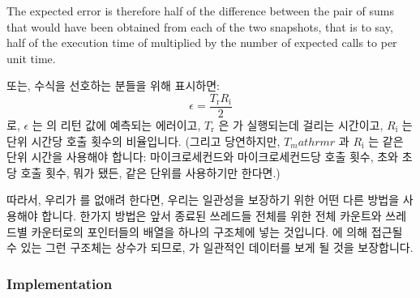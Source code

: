 {	The expected error is therefore half of the difference between
	the pair of sums that would have been obtained from each of the
	two snapshots, that is to say, half of the execution time of
	 multiplied by the number of expected calls to
	 per unit time.
	\fi

	또는, 수식을 선호하는 분들을 위해 표시하면:
	\begin{equation}
	\epsilon = \frac{T_\mathrm{r} R_\mathrm{i}}{2}
	\end{equation}
	로, $\epsilon$ 는  의 리턴 값에 예측되는 에러이고,
	$T_\mathrm{r}$ 은  가 실행되는데 걸리는 시간이고,
	$R_\mathrm{i}$ 는 단위 시간당  호출 횟수의 비율입니다.
	(그리고 당연하지만, $T_mathrm{r}$ 과 $R_\mathrm{i}$ 는 같은 단위 시간을
	사용해야 합니다:
	마이크로세컨드와 마이크로세컨드당 호출 횟수, 초와 초당 호출 횟수, 뭐가
	됐든, 같은 단위를 사용하기만 한다면.)
	\iffalse

	Or, for those who prefer equations:
	\begin{equation}
	\epsilon = \frac{T_\mathrm{r} R_\mathrm{i}}{2}
	\end{equation}
	where $\epsilon$ is the expected error in \co{read_count()}'s
	return value,
	$T_\mathrm{r}$ is the time that \co{read_count()} takes to execute,
	and $R_\mathrm{i}$ is the rate of \co{inc_count()} calls per unit time.
	(And of course, $T_\mathrm{r}$ and $R_\mathrm{i}$ should use the same units of
	time: microseconds and calls per microsecond, seconds and calls
	per second, or whatever, as long as they are the same units.)
	\fi
} \QuickQuizEnd

따라서, 우리가  를 없애려 한다면, 우리는 일관성을 보장하기 위한
어떤 다른 방법을 사용해야 합니다.
한가지 방법은 앞서 종료된 쓰레드들 전체를 위한 전체 카운트와 쓰레드별
카운터로의 포인터들의 배열을 하나의 구조체에 넣는 것입니다.
 에 의해 접근될 수 있는 그런 구조체는 상수가 되므로,
 가 일관적인 데이터를 보게 될 것을 보장합니다.
\iffalse

Therefore, if we are to dispense with \co{final_mutex}, we will need
to come up with some other method for ensuring consistency.
One approach is to place the total count for all previously exited
threads and the array of pointers to the per-thread counters into a single
structure.
Such a structure, once made available to \co{read_count()}, is
held constant, ensuring that \co{read_count()} sees consistent data.
\fi

\subsubsection{Implementation}

